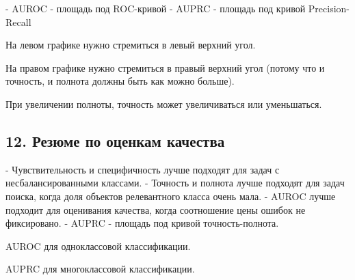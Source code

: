 - AUROC - площадь под ROC-кривой
- AUPRC - площадь под кривой Precision-Recall

На левом графике нужно стремиться в левый верхний угол.

На правом графике нужно стремиться в правый верхний угол (потому что и
точность, и полнота должны быть как можно больше).

При увеличении полноты, точность может увеличиваться или уменьшаться.

\subsection{12. Резюме по оценкам качества}

- Чувствительность и специфичность лучше подходят для задач с несбалансированными классами.
- Точность и полнота лучше подходят для задач поиска, когда доля объектов релевантного класса очень мала.
- AUROC лучше подходит для оценивания качества, когда соотношение цены
ошибок не фиксировано.
- AUPRC - площадь под кривой точность-полнота.

AUROC для одноклассовой классификации.

AUPRC для многоклассовой классификации.